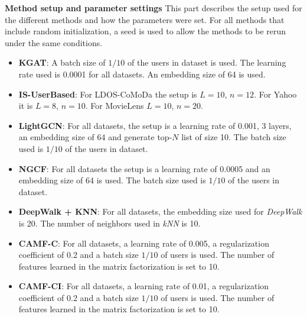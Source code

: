\textbf{Method setup and parameter settings}
This part describes the setup used for the different methods and how the parameters were set.
For all methods that include random initialization, a seed is used to allow the methods to be rerun under the same conditions.
\begin{itemize}
    \item \textbf{KGAT}: A batch size of $1/10$ of the users in dataset is used. The learning rate used is 0.0001 for all datasets. An embedding size of 64 is used.
    \item \textbf{IS-UserBased}: For LDOS-CoMoDa the setup is $L=10$, $n=12$. For Yahoo it is $L=8$, $n=10$. For MovieLens $L=10$, $n=20$.
    \item \textbf{LightGCN}: For all datasets, the setup is a learning rate of 0.001, 3 layers, an embedding size of 64 and generate top-$N$ list of size 10. The batch size used is $1/10$ of the users in dataset.
    \item \textbf{NGCF}: For all datasets the setup is a learning rate of 0.0005 and an embedding size of 64 is used. The batch size used is $1/10$ of the users in dataset.
    \item \textbf{DeepWalk + KNN}: For all datasets, the embedding size used for \textit{DeepWalk} is 20. The number of neighbors used in \textit{kNN} is 10.
    \item \textbf{CAMF-C}: For all datasets, a learning rate of 0.005, a regularization coefficient of 0.2 and a batch size $1/10$ of users is used. The number of features learned in the matrix factorization is set to 10.
    \item \textbf{CAMF-CI}: For all datasets, a learning rate of 0.01, a regularization coefficient of 0.2 and a batch size $1/10$ of users is used. The number of features learned in the matrix factorization is set to 10.
\end{itemize}
